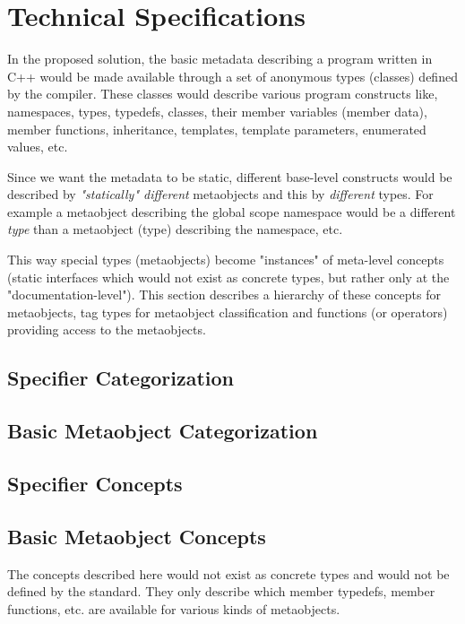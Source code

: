 \section{Technical Specifications}

In the proposed solution, the basic metadata describing a program written
in C++ would be made available through a set of anonymous types (classes)
defined by the compiler. These classes would describe various program
constructs like, namespaces, types, typedefs, classes, their member variables
(member data), member functions, inheritance, templates, template parameters,
enumerated values, etc.

Since we want the metadata to be static, different base-level constructs
would be described by {\em "statically" different} metaobjects and this
by {\em different} types.
For example a metaobject describing the global scope namespace would
be a different {\em type} than a metaobject (type) describing the \verb@std@
namespace, etc.

This way special types (metaobjects) become "instances" of meta-level
concepts (static interfaces which would not exist as concrete types,
but rather only at the "documentation-level").
This section describes a hierarchy of these concepts 
for metaobjects, tag types for metaobject classification and functions (or operators)
providing access to the metaobjects.

\subsection{}

\subsection{Specifier Categorization}

\subsection{Basic Metaobject Categorization}

\subsection{Specifier Concepts}

\subsection{Basic Metaobject Concepts}

The concepts described here would not exist as concrete types and would not
be defined by the standard.
They only describe which member typedefs, member functions, etc. are available
for various kinds of metaobjects.
